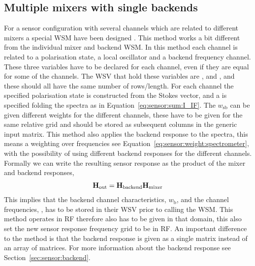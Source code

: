 \subsection{Multiple mixers with single backends}
For a sensor configuration with several channels which are related to different mixers a special WSM have been designed . 
This method works a bit different from the individual mixer and backend WSM. In this method each channel is related to a polarisation state, a local oscillator and a backend frequency channel. These three variables have to be declared for each channel, even if they are equal for some of the channels. 
The WSV that hold these variables are ,  and , and these should all have the same number of rows/length.
For each channel the specified polarisation state is constructed from the Stokes vector, and a  is specified folding the spectra as in Equation~\ref{eq:sensor:sum:I_IF}. The $w_\mathrm{sb}$ can be given different weights for the different channels, these have to be given for the same relative grid and should be stored as subsequent columns in the generic input matrix.
This method also applies the backend response to the spectra, this means a weighting over frequencies see Equation~\ref{eq:sensor:weight:spectrometer}, with the possibility of using different backend responses for the different channels. Formally we can write the resulting sensor response as the product of the mixer and backend responses,
\begin{equation}
\mathbf{H}_{\mathrm{out}} = \mathbf{H}_{\mathrm{backend}} \mathbf{H}_{\mathrm{mixer}}
\end{equation}
This implies that the backend channel characteristics, $w_\mathrm{b}$, and the channel frequencies, , has to be stored in their WSV prior to calling the WSM. This method operates in RF therefore  also has to be given in that domain, this also set the new sensor response frequency grid to be in RF. An important difference to the  method is that the backend response is given as a single matrix instead of an array of  matrices. For more information about the backend response see Section~\ref{sec:sensor:backend}.

